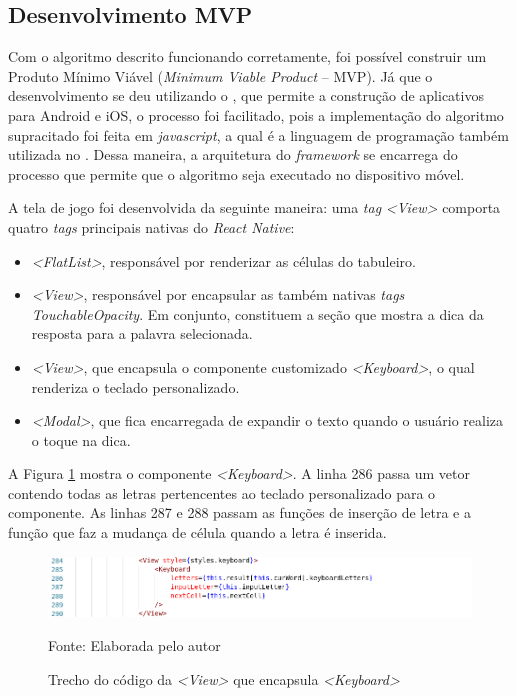 \subsection{Desenvolvimento MVP}
Com o algoritmo descrito funcionando corretamente, foi possível construir um Produto Mínimo Viável (\textit{Minimum Viable Product} -- MVP). Já que o desenvolvimento se deu utilizando o \cite{RN}, que permite a construção de aplicativos para Android e iOS, o processo foi facilitado, pois a implementação do algoritmo supracitado foi feita em \textit{javascript}, a qual é a linguagem de programação também utilizada no \cite{RN}. Dessa maneira, a arquitetura do \textit{framework} se encarrega do processo que permite que o algoritmo seja executado no dispositivo móvel.

A tela de jogo foi desenvolvida da seguinte maneira: uma \textit{tag} \textit{<View>} comporta quatro \textit{tags} principais nativas do \textit{React Native}:

\begin{itemize}
    \item \textit{<FlatList>}, responsável por renderizar as células do tabuleiro.
    \item \textit{<View>}, responsável por encapsular as também nativas \textit{tags} \textit{TouchableOpacity}. Em conjunto, constituem a seção que mostra a dica da resposta para a palavra selecionada. 
    \item \textit{<View>}, que encapsula o componente customizado \textit{<Keyboard>}, o qual renderiza o teclado personalizado.
    \item \textit{<Modal>}, que fica encarregada de expandir o texto quando o usuário realiza o toque na dica.
\end{itemize}

A Figura \ref{fig:keyboard} mostra o componente \textit{<Keyboard>}. A linha 286 passa um vetor contendo todas as letras pertencentes ao teclado personalizado para o componente. As linhas 287 e 288 passam as funções de inserção de letra e a função que faz a mudança de célula quando a letra é inserida. 

\begin{figure}[H]
\centering
    \caption{Trecho do código da \textit{<View>} que encapsula \textit{<Keyboard>}}
    \label{fig:keyboard}
    \includegraphics[width=1.0\textwidth]{Figuras/codeKeyboard.png}
    
    Fonte: Elaborada pelo autor
\end{figure}

